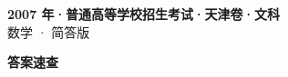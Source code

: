 \documentclass[zihao=-4, a4paper]{ctexart}
\begin{document}
\begin{center}
  {\Large\bfseries 2007 年·普通高等学校招生考试·天津卷·文科}\\[4pt]
  {\large 数学 · 简答版}
\end{center}
\medskip
{}

\clearpage
{}
\begin{center}{\Large\bfseries 答案速查}\end{center}
\medskip

\end{document}
